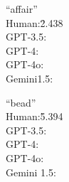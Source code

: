 \begin{center}
\begin{minipage}{0.45\linewidth}
\begin{tabbing}
``affair'' \\
\hspace{1em}Human:\quad \= 2.438 \\
\hspace{1em}GPT-3.5: \\
\hspace{1em}GPT-4: \\
\hspace{1em}GPT-4o: \\
\hspace{1em}Gemini1.5:
\end{tabbing}
\end{minipage}
\hspace{0.05\linewidth}
\begin{minipage}{0.45\linewidth}
\begin{tabbing}
``bead'' \\
\hspace{1em}Human:\quad \= 5.394 \\
\hspace{1em}GPT-3.5: \\
\hspace{1em}GPT-4: \\
\hspace{1em}GPT-4o: \\
\hspace{1em}Gemini 1.5:
\end{tabbing}
\end{minipage}
\end{center}

